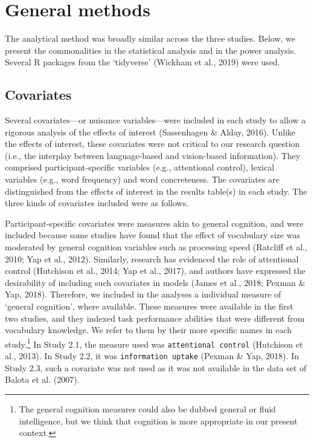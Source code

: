 \documentclass[
  12pt,
  man,floatsintext]{apa7}
\begin{document}
\hypertarget{general-methods}{%
\section{General methods}\label{general-methods}}

The analytical method was broadly similar across the three studies. Below, we present the commonalities in the statistical analysis and in the power analysis. Several R packages from the `tidyverse' (Wickham et al., 2019) were used.

\hypertarget{covariates}{%
\subsection{Covariates}\label{covariates}}

Several covariates---or nuisance variables---were included in each study to allow a rigorous analysis of the effects of interest (Sassenhagen \& Alday, 2016). Unlike the effects of interest, these covariates were not critical to our research question (i.e., the interplay between language-based and vision-based information). They comprised participant-specific variables (e.g., attentional control), lexical variables (e.g., word frequency) and word concreteness. The covariates are distinguished from the effects of interest in the results table(s) in each study. The three kinds of covariates included were as follows.

Participant-specific covariates were measures akin to general cognition, and were included because some studies have found that the effect of vocabulary size was moderated by general cognition variables such as processing speed (Ratcliff et al., 2010; Yap et al., 2012). Similarly, research has evidenced the role of attentional control (Hutchison et al., 2014; Yap et al., 2017), and authors have expressed the desirability of including such covariates in models (James et al., 2018; Pexman \& Yap, 2018). Therefore, we included in the analyses a individual measure of `general cognition', where available. These measures were available in the first two studies, and they indexed task performance abilities that were different from vocabulary knowledge. We refer to them by their more specific names in each study.\footnote{The general cognition measures could also be dubbed general or fluid intelligence, but we think that cognition is more appropriate in our present context.} In Study 2.1, the measure used was \texttt{attentional\ control} (Hutchison et al., 2013). In Study 2.2, it was \texttt{information\ uptake} (Pexman \& Yap, 2018). In Study 2.3, such a covariate was not used as it was not available in the data set of Balota et al. (2007).
\end{document}
